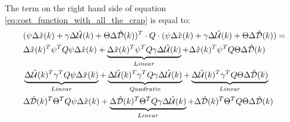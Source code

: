 The term on the right hand side of equation \ref{eq:cost_function_with_all_the_crap} is equal to:
\begin{equation}\label{eq:cost_function_big_eq}
	\begin{aligned}
	&(\psi\Delta \hat{x}(k) + \gamma\Delta \hat{\CMcal{U}}(k) + \Theta\Delta \hat{\CMcal{D}}(k))^T\cdot Q \cdot (\psi\Delta \hat{x}(k) + \gamma\Delta \hat{\CMcal{U}}(k) + \Theta\Delta \hat{\CMcal{D}}(k)) = \\
	& \Delta \hat{x}(k)^T\psi ^T Q \psi \Delta \hat{x}(k) + \underbrace{\Delta \hat{x}(k)^T \psi ^T Q \gamma \Delta  \hat{\CMcal{U}}(k) }_{Linear} +\Delta \hat{x}(k)^T \psi ^T Q \Theta \Delta \hat{\CMcal{D}}(k) \\
	& \underbrace{\Delta \hat{\CMcal{U}}(k)^T \gamma ^T Q \psi\Delta \hat{x}(k)}_{Linear} + \underbrace{\Delta \hat{\CMcal{U}}(k)^T\gamma ^T Q \gamma\Delta \hat{\CMcal{U}}(k)}_{Quadratic} +\underbrace{\Delta \hat{\CMcal{U}}(k)^T \gamma ^T Q\Theta \Delta\hat{\CMcal{D}}(k)}_{Linear} \\ 
	& \Delta \hat{\CMcal{D}}(k)^T \Theta ^T Q  \psi \Delta \hat{x}(k)					+ \underbrace{\Delta \hat{\CMcal{D}}(k)^T \Theta ^T Q \gamma  \Delta \hat{\CMcal{U}}(k) }_{Linear}	+\Delta \hat{\CMcal{D}}(k)^T \Theta ^T Q \Theta \Delta \hat{\CMcal{D}}(k)
		\end{aligned}
\end{equation}


